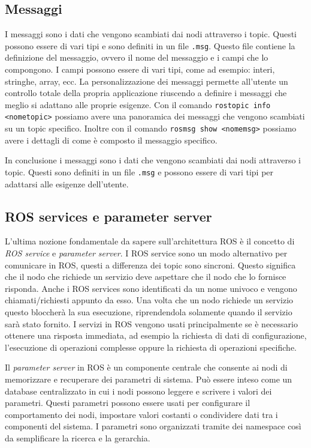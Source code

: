\subsection{Messaggi}
\label{subsec:messaggi}
I messaggi sono i dati che vengono scambiati dai nodi attraverso i topic. Questi possono essere di vari tipi e sono definiti in un file \verb+.msg+. Questo file contiene la definizione del messaggio, ovvero il nome del messaggio e i campi che lo compongono. I campi possono essere di vari tipi, come ad esempio: interi, stringhe, array, ecc.
La personalizzazione dei messaggi permette all'utente un controllo totale della propria applicazione riuscendo a definire i messaggi che meglio si adattano alle proprie esigenze.
Con il comando \verb+rostopic info <nometopic>+ possiamo avere una panoramica dei messaggi che vengono scambiati su un topic specifico. Inoltre con il comando \verb+rosmsg show <nomemsg>+ possiamo avere i dettagli di come è composto il messaggio specifico.

In conclusione i messaggi sono i dati che vengono scambiati dai nodi attraverso i topic. Questi sono definiti in un file \verb+.msg+ e possono essere di vari tipi per adattarsi alle esigenze dell'utente.
\subsection{ROS services e parameter server}
\label{subsec:servandparam}
L'ultima nozione fondamentale da sapere sull'architettura ROS è il concetto di \textit{ROS service} e \textit{parameter server}. I ROS service sono un modo alternativo per comunicare in ROS, questi a differenza dei topic sono sincroni. Questo significa che il nodo che richiede un servizio deve aspettare che il nodo che lo fornisce risponda. 
Anche i ROS services sono identificati da un nome univoco e vengono chiamati/richiesti appunto da esso. Una volta che un nodo richiede un servizio questo bloccherà la sua esecuzione, riprendendola solamente quando il servizio sarà stato fornito.
I servizi in ROS vengono usati principalmente se è necessario ottenere una risposta immediata, ad esempio la richiesta di dati di configurazione, l'esecuzione di operazioni complesse oppure la richiesta di operazioni specifiche.

Il \textit{parameter server} in ROS è un componente centrale che consente ai nodi di memorizzare e recuperare dei parametri di sistema. Può essere inteso come un database centralizzato in cui i nodi possono leggere e scrivere i valori dei parametri.
Questi parametri possono essere usati per configurare il comportamento dei nodi, impostare valori costanti o condividere dati tra i componenti del sistema. I parametri sono organizzati tramite dei namespace così da semplificare la ricerca e la gerarchia.

